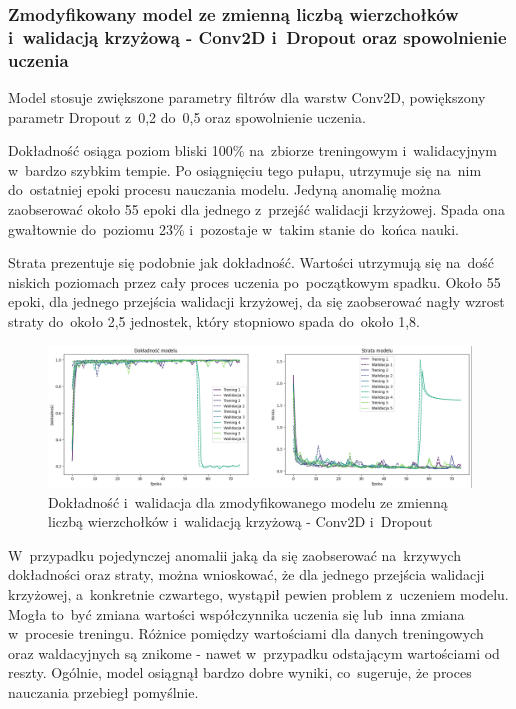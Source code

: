 \subsubsection{Zmodyfikowany model ze zmienną liczbą wierzchołków i~walidacją krzyżową - Conv2D i~Dropout oraz spowolnienie uczenia}

Model stosuje zwiększone parametry filtrów dla warstw Conv2D, powiększony parametr Dropout z~0,2 do~0,5
oraz spowolnienie uczenia.

Dokładność osiąga poziom bliski 100\% na~zbiorze treningowym i~walidacyjnym w~bardzo szybkim tempie.
Po osiągnięciu tego pułapu, utrzymuje się na~nim do~ostatniej epoki procesu nauczania modelu.
Jedyną anomalię można zaobserować około 55 epoki dla jednego z~przejść walidacji krzyżowej.
Spada ona gwałtownie do~poziomu 23\% i~pozostaje w~takim stanie do~końca nauki.

Strata prezentuje się podobnie jak dokładność.
Wartości utrzymują się na~dość niskich poziomach przez cały proces uczenia po~początkowym spadku.
Około 55 epoki, dla jednego przejścia walidacji krzyżowej,
da się zaobserować nagły wzrost straty do~około 2,5 jednostek, który stopniowo spada do~około 1,8.

\begin{figure}[ht]
	\centering
	\includegraphics[width=15.5cm]{resources/tests/images/v4/multiple_edges_crossvalid_1_img.png}
	\caption{Dokładność i~walidacja dla zmodyfikowanego modelu ze zmienną liczbą wierzchołków i~walidacją krzyżową - Conv2D i~Dropout}
	\label{Fig:tests-csvar-1a}
\end{figure}
\FloatBarrier

W~przypadku pojedynczej anomalii jaką da się zaobserować na~krzywych dokładności oraz straty,
można wnioskować, że dla jednego przejścia walidacji krzyżowej, a~konkretnie czwartego, wystąpił pewien problem z~uczeniem modelu.
Mogła to~być zmiana wartości współczynnika uczenia się lub~inna zmiana w~procesie treningu.
Różnice pomiędzy wartościami dla danych treningowych oraz waldacyjnych są znikome - nawet w~przypadku odstającym wartościami od reszty.
Ogólnie, model osiągnął bardzo dobre wyniki, co~sugeruje, że proces nauczania przebiegł pomyślnie.

